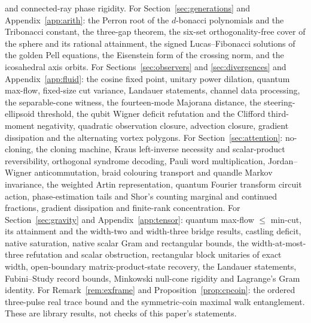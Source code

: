 \documentclass[aps,pra,onecolumn,superscriptaddress,nofootinbib,10pt]{revtex4-2}
\theoremstyle{definition}
\theoremstyle{remark}
\begin{document}
{and connected-ray phase rigidity.  For Section~\ref{sec:generations} and Appendix~\ref{app:arith}: the Perron root of the $d$-bonacci
polynomials and the Tribonacci constant, the three-gap theorem, the six-set orthogonality-free cover of the
sphere and its rational attainment, the signed Lucas--Fibonacci solutions of the golden Pell equations,
the Eisenstein form of the crossing norm, and the icosahedral axis orbits.  For Sections~\ref{sec:observers} and \ref{sec:divergences} and Appendix~\ref{app:fluid}: the cosine fixed point,
unitary power dilation, quantum max-flow, fixed-size cut variance, Landauer statements, channel data
processing, the separable-cone witness, the fourteen-mode Majorana distance, the steering-ellipsoid
threshold, the qubit Wigner deficit refutation and the Clifford third-moment negativity, quadratic
observation closure, advection closure, gradient dissipation and the alternating vortex polygons.  For Section~\ref{sec:attention}: no-cloning, the cloning machine, Kraus
left-inverse necessity and scalar-product reversibility, orthogonal syndrome decoding, Pauli word
multiplication, Jordan--Wigner anticommutation, braid colouring transport and quandle Markov invariance,
the weighted Artin representation, quantum Fourier transform circuit action, phase-estimation tails and
Shor's counting marginal and continued fractions, gradient dissipation and finite-rank concentration.  For
Section~\ref{sec:gravity} and Appendix~\ref{app:tensor}: quantum max-flow $\le$ min-cut, its attainment and the width-two and width-three
bridge results, castling deficit, native saturation, native scalar Gram and rectangular bounds, the
width-at-most-three refutation and scalar obstruction, rectangular block unitaries of exact width,
open-boundary matrix-product-state recovery, the Landauer statements, Fubini--Study record bounds,
Minkowski null-cone rigidity and Lagrange's Gram identity.  For Remark~\ref{rem:exframe} and
Proposition~\ref{prop:cpcoin}: the ordered three-pulse real trace bound and the symmetric-coin maximal walk
entanglement.  These are library results,
not checks of this paper's statements.\par}
\end{document}

